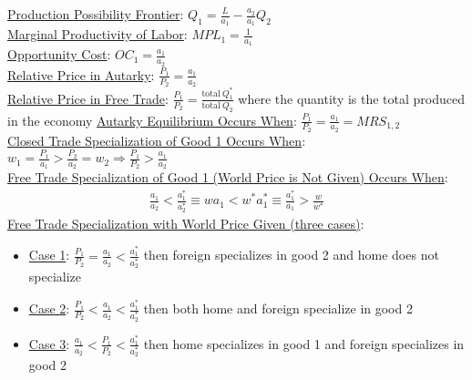 \documentclass{article}
\begin{document}
\underline{Production Possibility Frontier}: $Q_{1} = \frac{L}{a_{1}} - \frac{a_{2}}{a_{1}}Q_{2}$ \\
\underline{Marginal Productivity of Labor}: $MPL_{1} = \frac{1}{a_{1}}$ \\
\underline{Opportunity Cost}: $OC_{1} = \frac{a_{1}}{a_{2}}$ \\
\underline{Relative Price in Autarky}: $\frac{P_{1}}{P_{2}} = \frac{a_{1}}{a_{2}}$ \\
\underline{Relative Price in Free Trade}: $\frac{P_{1}}{P_{2}} = \frac{\text{total} \ Q_{1}^{*}}{\text{total} \ Q_{2}}$ where the quantity is the total produced in the economy
\underline{Autarky Equilibrium Occurs When}: $\frac{P_{1}}{P_{2}} = \frac{a_{1}}{a_{2}} = MRS_{1,2}$ \\
\underline{Closed Trade Specialization of Good 1 Occurs When}: $w_{1} = \frac{P_{1}}{a_{1}} > \frac{P_{2}}{a_{2}} = w_{2} \Rightarrow \frac{P_{1}}{P_{2}} > \frac{a_{1}}{a_{2}}$ \\
\underline{Free Trade Specialization of Good 1 (World Price is Not Given) Occurs When}:
 \begin{gather*}
   \frac{a_{1}}{a_{2}} < \frac{a_{1}^{*}}{a_{2}^{*}} \equiv wa_{1} < w^{*}a_{1}^{*} \equiv \frac{a_{1}^{*}}{a_{1}} > \frac{w}{w^{*}}
 \end{gather*}
\underline{Free Trade Specialization with World Price Given (three cases)}:
\begin{itemize}
  \item  \underline{Case 1}: $\frac{P_{1}}{P_{2}} = \frac{a_{1}}{a_{2}} < \frac{a_{1}^{*}}{a_{2}^{*}}$ then foreign specializes in good 2 and home does not specialize
  \item  \underline{Case 2}: $\frac{P_{1}}{P_{2}} < \frac{a_{1}}{a_{2}} < \frac{a_{1}^{*}}{a_{2}^{*}}$ then both home and foreign specialize in good 2
  \item  \underline{Case 3}: $\frac{a_{1}}{a_{2}} < \frac{P_{1}}{P_{2}} < \frac{a_{1}^{*}}{a_{2}^{*}}$ then home specializes in good 1 and foreign specializes in good 2
\end{itemize}
\end{document}
